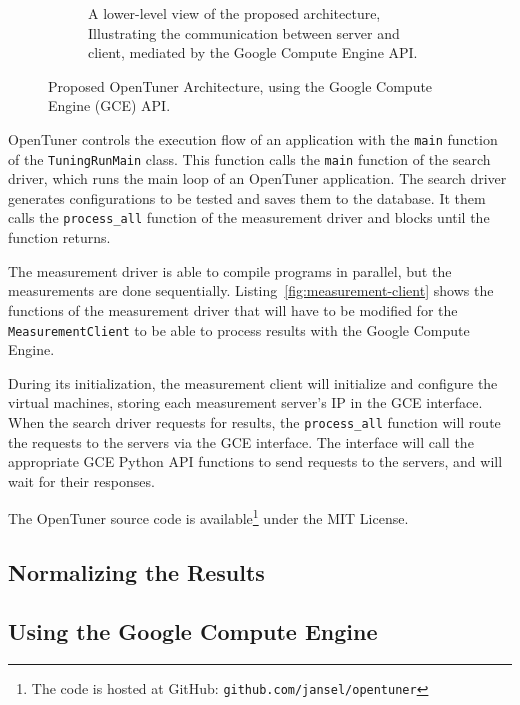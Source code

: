 \documentclass[a4paper, 12pt]{article}
\begin{document}
\begin{figure}[htpb]
\begin{subfigure}{.45\textwidth}
        \caption{A lower-level view of the proposed architecture,
        Illustrating the communication between server and client,
        mediated by the Google Compute Engine API.
        }
        \label{fig:low-level}
    \end{subfigure}%
    \caption{Proposed OpenTuner Architecture,
    using the Google Compute Engine (GCE) API.}
    \label{fig:archs}
\end{figure}

OpenTuner controls the execution flow of an application
with the \texttt{\footnotesize main} function of the
\texttt{\footnotesize TuningRunMain} class. This function
calls the \texttt{\footnotesize main} function of the
search driver, which runs the main loop of an OpenTuner
application. The search driver generates configurations
to be tested and saves them to the database. It them calls
the \texttt{\footnotesize process\_all} function of the
measurement driver and blocks until the function returns.

The measurement driver is able to compile programs in parallel,
but the measurements are done sequentially.
Listing~\ref{fig:measurement-client} shows the functions of
the measurement driver that will have to be modified for the
\texttt{\footnotesize MeasurementClient} to be able to
process results with the Google Compute Engine.

During its initialization, the measurement client will
initialize and configure the virtual machines, storing
each measurement server's IP in the GCE interface.
When the search driver requests for results,
the \texttt{\footnotesize process\_all} function will route
the requests to the servers via the GCE interface.
The interface will call the appropriate GCE Python API
functions to send requests to the servers, and will wait
for their responses.

The OpenTuner source code is
available\footnote{The code is hosted at GitHub:
\texttt{\scriptsize github.com/jansel/opentuner}} under
the MIT License.



\subsection{Normalizing the Results}

\subsection{Using the Google Compute Engine} \label{sec:pwork}
\end{document}
